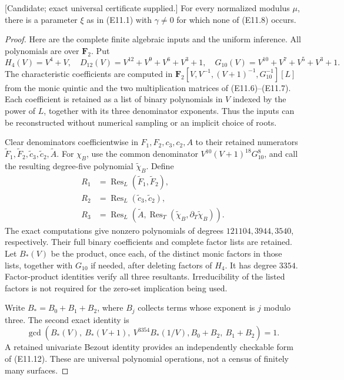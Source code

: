 \begin{lemma}
\label{lem:uniform-eleven-good-parameters-candidate}
\textup{[Candidate; exact universal certificate supplied.]}
For every normalized modulus $\mu$, there is a parameter $\xi$ as
in (E11.1) with $\gamma\ne0$ for which none of (E11.8) occurs.
\end{lemma}
\begin{proof}
Here are the complete finite algebraic inputs and the uniform inference.
All polynomials are over $\mathbf F_2$. Put
\[
 H_4(V)=V^4+V,\quad D_{12}(V)=V^{12}+V^9+V^6+V^3+1,
 \quad G_{10}(V)=V^{10}+V^7+V^5+V^3+1.
\]
The characteristic coefficients are computed in
$\mathbf F_2[V,V^{-1},(V+1)^{-1},G_{10}^{-1}][L]$ from the monic
quintic and the two multiplication matrices of (E11.6)--(E11.7).
Each coefficient is retained as a list of binary polynomials in $V$
indexed by the power of $L$, together with its three denominator
exponents. Thus the inputs can be reconstructed without numerical
sampling or an implicit choice of roots.

Clear denominators coefficientwise in $F_1,F_2,c_3,c_2,A$ to their
retained numerators $\widetilde F_1,\widetilde F_2,
\widetilde c_3,\widetilde c_2,\widetilde A$.
For $\chi_B$, use the common denominator
$V^{10}(V+1)^{18}G_{10}^8$, and call the resulting degree-five
polynomial $\widetilde\chi_B$. Define
\[
\begin{split}
 R_1&=\operatorname{Res}_L(\widetilde F_1,\widetilde F_2),\\
 R_2&=\operatorname{Res}_L(\widetilde c_3,\widetilde c_2),\\
 R_3&=\operatorname{Res}_L\left(\widetilde A,
       \operatorname{Res}_T(\widetilde\chi_B,
                           \partial_T\widetilde\chi_B)\right).
\end{split}                                                     \tag{E11.11}
\]
The exact computations give nonzero polynomials of degrees
$121104,3944,3540$, respectively. Their full binary coefficients and
complete factor lists are retained. Let $B_*(V)$ be the product, once
each, of the distinct monic factors in those lists, together with
$G_{10}$ if needed, after deleting factors of $H_4$.
It has degree $3354$. Factor-product identities verify all three
resultants. Irreducibility of the listed factors is not required for
the zero-set implication being used.

Write $B_* = B_0+B_1+B_2$, where $B_j$ collects terms whose exponent
is $j$ modulo three. The second exact identity is
\[
 \gcd\left(B_*(V),\ B_*(V+1),\ V^{3354}B_*(1/V),
                  B_0+B_2,\ B_1+B_2\right)=1.                  \tag{E11.12}
\]
A retained univariate Bezout identity provides an independently
checkable form of (E11.12). These are universal polynomial operations,
not a census of finitely many surfaces.


\end{proof}
